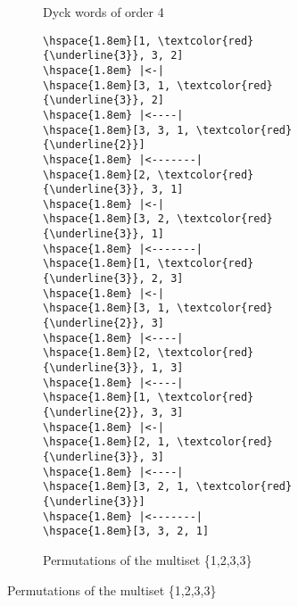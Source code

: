 \begin{figure}
\begin{center}
\begin{subfigure}[]{.40\textwidth}
\begin{center}
\begin{Verbatim}[commandchars=\\\{\}]
\end{Verbatim}
            \end{center}
            \caption{Dyck words of order 4}
            \label{subfig:coolDyck}
        \end{subfigure}
        \begin{subfigure}[]{.24\textwidth}
            \begin{center}
\begin{Verbatim}[commandchars=\\\{\}]
\hspace{1.8em}[1, \textcolor{red}{\underline{3}}, 3, 2]
\hspace{1.8em} |<-|
\hspace{1.8em}[3, 1, \textcolor{red}{\underline{3}}, 2]
\hspace{1.8em} |<----|
\hspace{1.8em}[3, 3, 1, \textcolor{red}{\underline{2}}]
\hspace{1.8em} |<-------|
\hspace{1.8em}[2, \textcolor{red}{\underline{3}}, 3, 1]
\hspace{1.8em} |<-|
\hspace{1.8em}[3, 2, \textcolor{red}{\underline{3}}, 1]
\hspace{1.8em} |<-------|
\hspace{1.8em}[1, \textcolor{red}{\underline{3}}, 2, 3]
\hspace{1.8em} |<-|
\hspace{1.8em}[3, 1, \textcolor{red}{\underline{2}}, 3]
\hspace{1.8em} |<----|
\hspace{1.8em}[2, \textcolor{red}{\underline{3}}, 1, 3]
\hspace{1.8em} |<----|
\hspace{1.8em}[1, \textcolor{red}{\underline{2}}, 3, 3]
\hspace{1.8em} |<-|
\hspace{1.8em}[2, 1, \textcolor{red}{\underline{3}}, 3]
\hspace{1.8em} |<----|
\hspace{1.8em}[3, 2, 1, \textcolor{red}{\underline{3}}]
\hspace{1.8em} |<-------|
\hspace{1.8em}[3, 3, 2, 1]
\end{Verbatim}
            \end{center}
	    \caption{Permutations of the multiset \{1,2,3,3\}}
            \label{subfig:coolPerms}
        \end{subfigure}

\end{center}
\end{figure}
